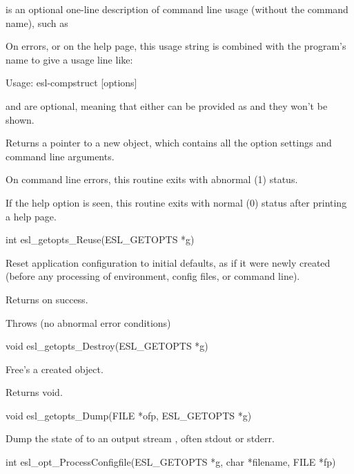 \begin{sreapi}
 is an optional one-line description of command
line usage (without the command name), such as
\begin{cchunk}
[options]  
\end{cchunk}
On errors, or
on the help page, this usage string is combined with 
the program's name to give a usage line like:

\begin{cchunk}
Usage: esl-compstruct [options]  
\end{cchunk}  

 and  are optional, meaning that either
can be provided as  and they won't be shown.

Returns a pointer to a new  object, which contains
all the option settings and command line arguments.

On command line errors, this routine exits with abnormal
(1) status.

If the  help option is seen, this routine exits with
normal (0) status after printing a help page.



\hypertarget{func:esl_getopts_Reuse()}
{\item[int esl\_getopts\_Reuse(ESL\_GETOPTS *g)]}

Reset application configuration  to initial defaults,
as if it were newly created (before any 
processing of environment, config files, or
command line). 

Returns  on success.

Throws (no abnormal error conditions)



\hypertarget{func:esl_getopts_Destroy()}
{\item[void esl\_getopts\_Destroy(ESL\_GETOPTS *g)]}

Free's a created  object.

Returns void.


\hypertarget{func:esl_getopts_Dump()}
{\item[void esl\_getopts\_Dump(FILE *ofp, ESL\_GETOPTS *g)]}

Dump the state of  to an output stream
, often stdout or stderr.


\hypertarget{func:esl_opt_ProcessConfigfile()}
{\item[int esl\_opt\_ProcessConfigfile(ESL\_GETOPTS *g, char *filename, FILE *fp)]}


\end{sreapi}
